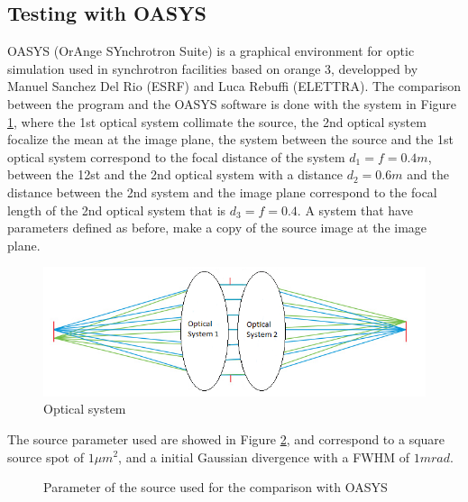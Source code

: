 \subsection{Testing with OASYS}
%
OASYS (OrAnge SYnchrotron Suite) is a graphical environment for optic simulation used in synchrotron facilities based on orange 3, developped by Manuel Sanchez Del Rio (ESRF) and Luca Rebuffi (ELETTRA).
The comparison between the program and the OASYS software is done with the system in Figure \ref{fig: Optical system}, where the 1st optical system collimate the source, the 2nd optical system focalize the mean at the image plane, the system between the source and the 1st optical system correspond to the focal distance of the system $d_1 = f = 0.4 m $, between the 12st and the 2nd optical system with a distance $d_2 = 0.6 m $ and the distance between the 2nd system and the image plane correspond to the focal length of the 2nd optical system that is $d_3 = f = 0.4$. A system that have parameters defined as before, make a copy of the source image at the image plane.
%
\begin{figure}[]
%
\centering
%
\includegraphics[width=.6\textwidth]{Immagini/Chapter4/OpticalSystems}
%
\caption{Optical system}
%
\label{fig: Optical system}
%
\end{figure}
%
The source parameter used are showed in Figure \ref{fig: Source Parameter for OASYS}, and correspond to  a square source spot of $1 \mu m^2 $, and a initial Gaussian divergence with a FWHM of $1 mrad $.
\begin{figure}[]
%
\centering
%
%
%
\caption{Parameter of the source used for the comparison with OASYS}
%
\label{fig: Source Parameter for OASYS}
%
\end{figure}
